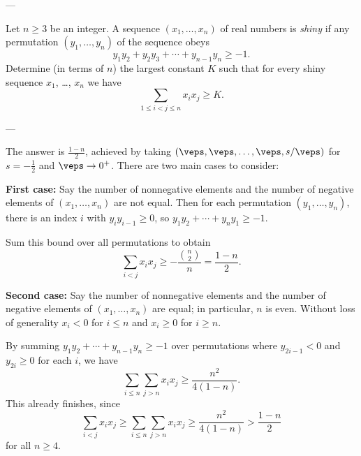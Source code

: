 
---

Let $n\ge3$ be an integer. A sequence $(x_1,\ldots,x_n)$ of real numbers is \emph{shiny} if any permutation $(y_1,\ldots,y_n)$ of the sequence obeys \[y_1y_2+y_2y_3+\cdots+y_{n-1}y_n\ge-1.\]
Determine (in terms of $n$) the largest constant $K$ such that for every shiny sequence $x_1$, \ldots, $x_n$ we have \[\sum_{1\le i<j\le n}x_ix_j\ge K.\]

---

The answer is $\frac{1-n}2$, achieved by taking $(\veps,\veps,\ldots,\veps,s/\veps)$ for $s=-\frac12$ and $\veps\to0^+$. There are two main cases to consider:

\bigskip

\textbf{First case:} Say the number of nonnegative elements and the number of negative elements of $(x_1,\ldots,x_n)$ are not equal. Then for each permutation $(y_1,\ldots,y_n)$, there is an index $i$ with $y_iy_{i-1}\ge0$, so $y_1y_2+\cdots+y_ny_1\ge-1$.

Sum this bound over all permutations to obtain \[\sum_{i<j}x_ix_j\ge-\frac{\binom n2}n=\frac{1-n}2.\]

\bigskip

\textbf{Second case:} Say the number of nonnegative elements and the number of negative elements of $(x_1,\ldots,x_n)$ are equal; in particular, $n$ is even. Without loss of generality $x_i<0$ for $i\le n$ and $x_i\ge0$ for $i\ge n$.

By summing $y_1y_2+\cdots+y_{n-1}y_n\ge-1$ over permutations where $y_{2i-1}<0$ and $y_{2i}\ge0$ for each $i$, we have \[\sum_{i\le n}\sum_{j>n}x_ix_j\ge\frac{n^2}{4(1-n)}.\]
This already finishes, since \[\sum_{i<j}x_ix_j\ge\sum_{i\le n}\sum_{j>n}x_ix_j\ge\frac{n^2}{4(1-n)}>\frac{1-n}2\]
for all $n\ge4$.

